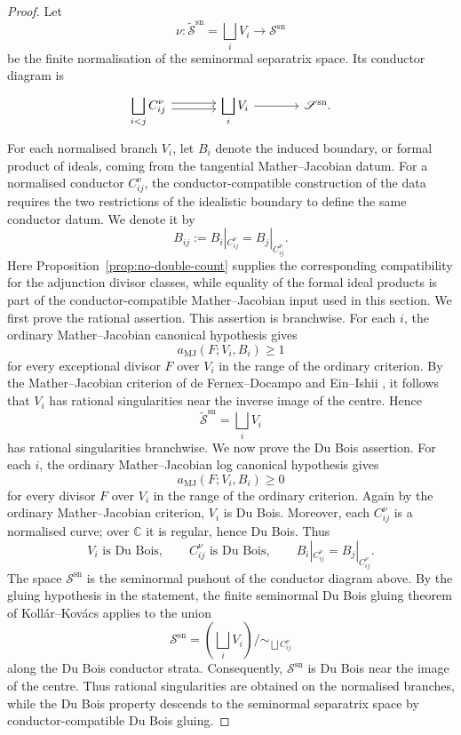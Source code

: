\documentclass[11pt]{amsart}
\numberwithin{equation}{section}
\theoremstyle{plain}
\theoremstyle{definition}
\newcommand{\MJ}{\mathrm{MJ}}
\newcommand{\sn}{\mathrm{sn}}
\newcommand{\bC}{\mathbb C}
\newcommand{\sS}{\mathscr S}
\begin{document}
\begin{proof}
Let
\[
\nu:\widetilde{\sS}^{\sn}
=
\bigsqcup_i V_i
\longrightarrow
\sS^{\sn}
\]
be the finite normalisation of the seminormal separatrix space.  Its
conductor diagram is
\[
\begin{tikzcd}[column sep=large]
\displaystyle\bigsqcup_{i<j} C_{ij}^{\nu}
\arrow[r,shift left=.55ex]
\arrow[r,shift right=.55ex]
&
\displaystyle\bigsqcup_i V_i
\arrow[r]
&
\sS^{\sn}.
\end{tikzcd}
\]
For each normalised branch \(V_i\), let \(B_i\) denote the induced boundary,
or formal product of ideals, coming from the tangential
Mather--Jacobian datum.  For a normalised conductor \(C_{ij}^{\nu}\), the
conductor-compatible construction of the data requires the two restrictions
of the idealistic boundary to define the same conductor datum.  We denote it
by
\[
B_{ij}:=B_i|_{C_{ij}^{\nu}}=B_j|_{C_{ij}^{\nu}}.
\]
Here Proposition~\ref{prop:no-double-count} supplies the corresponding
compatibility for the adjunction divisor classes, while equality of the
formal ideal products is part of the conductor-compatible Mather--Jacobian
input used in this section.
We first prove the rational assertion.  This assertion is branchwise.  For
each \(i\), the ordinary Mather--Jacobian canonical hypothesis gives
\[
a_{\MJ}(F;V_i,B_i)\geq 1
\]
for every exceptional divisor \(F\) over \(V_i\) in the range of the ordinary
criterion.  By the Mather--Jacobian criterion of de Fernex--Docampo and
Ein--Ishii \cite{dFD,EI}, it follows that $V_i$ has rational singularities near the inverse image of the centre.  Hence
\[
\widetilde{\sS}^{\sn}
=
\bigsqcup_i V_i
\]
has rational singularities branchwise.
We now prove the Du Bois assertion.  For each \(i\), the ordinary
Mather--Jacobian log canonical hypothesis gives
\[
a_{\MJ}(F;V_i,B_i)\geq 0
\]
for every divisor \(F\) over \(V_i\) in the range of the ordinary criterion.
Again by the ordinary Mather--Jacobian criterion, $V_i$ is Du Bois.
Moreover, each \(C_{ij}^{\nu}\) is a normalised curve; over \(\bC\) it is
regular, hence Du Bois.  Thus
\[
V_i \text{ is Du Bois},\qquad
C_{ij}^{\nu} \text{ is Du Bois},\qquad
B_i|_{C_{ij}^{\nu}}=B_j|_{C_{ij}^{\nu}}.
\]
The space \(\sS^{\sn}\) is the seminormal pushout of the conductor diagram
above.  By the gluing hypothesis in the statement, the finite seminormal
Du Bois gluing theorem of Koll\'ar--Kov\'acs applies to the union
\[
\sS^{\sn}
=
\left(\bigsqcup_i V_i\right)
/\!\sim_{\bigsqcup C_{ij}^{\nu}}
\]
along the Du Bois conductor strata.  Consequently, \(\sS^{\sn}\) is
Du Bois near the image of the centre.  Thus rational singularities are
obtained on the normalised branches, while
the Du Bois property descends to the seminormal separatrix space by
conductor-compatible Du Bois gluing.
\end{proof}
\end{document}
